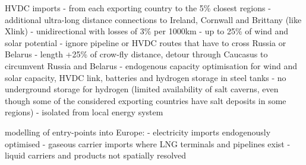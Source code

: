 HVDC imports
- from each exporting country to the 5\% closest regions
- additional ultra-long distance connections to Ireland, Cornwall and Brittany (like Xlink)
- unidirectional with losses of 3\% per 1000km
- up to 25\% of wind and solar potential
- ignore pipeline or HVDC routes that have to cross Russia or Belarus
- length +25\% of crow-fly distance, detour through Caucasus to circumvent Russia and Belarus
- endogenous capacity optimisation for wind and solar capacity, HVDC link, batteries and hydrogen storage in steel tanks
- no underground storage for hydrogen (limited availability of salt caverns, even though some of the considered exporting countries have salt deposits in some regions)
- isolated from local energy system


modelling of entry-points into Europe:
- electricity imports endogenously optimised
- gaseous carrier imports where LNG terminals and pipelines exist
- liquid carriers and products not spatially resolved